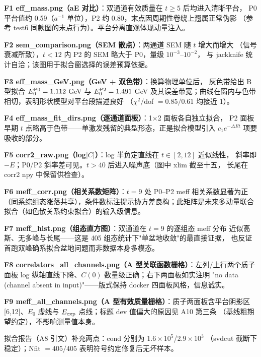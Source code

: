 \documentclass[UTF8]{ctexart}
\begin{document}
\textbf{F1 eff\_mass.png（aE 对比）}：双通道有效质量在 $t\ge5$ 后均进入清晰平台，
P0 平台值约 0.59（$a^{-1}$ 单位），P2 约 0.80，末点因周期性卷绕上翘属正常伪影
（参考 test6 同款图的末点行为）。平台分离直观体现动量注入。

\textbf{F2 sem\_comparison.png（SEM 散点）}：两通道 SEM 随 $t$ 增大而增大
（信号衰减所致），$t<12$ 内 P2 的 SEM 略大于 P0，量级 $10^{-3}$--$10^{-2}$，
与 jackknife 统计自洽；该图用于拟合窗选择的误差预算依据。

\textbf{F3 eff\_mass\_GeV.png（GeV + 双色带）}：换算物理单位后，
灰色带给出 B 型拟合 $E_0^{\rm P0}=1.112$ GeV 与 $E_0^{\rm P2}=1.491$ GeV
及其误差带宽；曲线在窗内与色带相切，表明形状模型对平台段描述良好
（$\chi^2/$dof $=0.85/0.61$ 均接近 1）。

\textbf{F4 eff\_mass\_fit\_dirs.png（逐通道面板）}：1$\times$2 面板各自独立拟合，
P2 面板早期 $t$ 点略高于色带——单激发残留的典型形态，正是拟合模型引入
$c_1e^{-\Delta Et}$ 项要吸收的部分。

\textbf{F5 corr2\_raw.png（log$|C|$）}：log 半负定直线在 $t\in[2,12]$ 近似线性，
斜率即 $-E$；P0/P2 斜率差可见。$t>40$ 后进入噪声底（图中 xlim 截至十五，
长尾在 corr2 npy 中保留供检查）。

\textbf{F6 meff\_corr.png（相关系数矩阵）}：$t=9$ 处 P0--P2 meff 相关系数显著为正
（同系综组态涨落共享），条件数标注提示协方差良构；此矩阵是未来多动量联合
拟合（如色散关系约束拟合）的输入级信息。

\textbf{F7 meff\_hist.png（组态直方图）}：双通道在 $t=9$ 的逐组态 meff 分布
近似高斯、无多峰与长尾——这是 405 组态统计下"单盆地收敛"的最直接证据，
也反证首跑双峰确系拟合盆地问题而非数据本身多模态。

\textbf{F8 correlators\_all\_channels.png（A 型关联函数栅格）}：左列/上行两个质子
面板 log 纵轴直线下降、$C(0)$ 数量级正确；右下两面板如实注明
"no data (channel absent in input)"——版式保持 docker 四面板风格，信息诚实。

\textbf{F9 meff\_all\_channels.png（A 型有效质量栅格）}：质子两面板含平台阴影区
[6,12]、$E_0$ 虚线与 $E_{\rm exp}$ 点线；标题 dev 值偏大的原因见 A10 第三条
（基线粗期望约定），不影响测量值本身。

拟合报告（A8 引文）补充两点：cond 分别为 $1.6\times10^5$/$2.9\times10^3$
（svdcut 截断下稳定）；Nfit $=405/405$ 表明符号约定修复后无坏样本。
\end{document}
